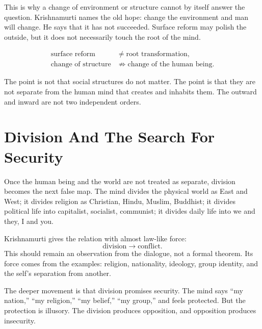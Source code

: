 \documentclass[11pt,oneside]{book}
\begin{document}
This is why a change of environment or structure cannot by itself answer the question. Krishnamurti names the old hope: change the environment and man will change. He says that it has not succeeded. Surface reform may polish the outside, but it does not necessarily touch the root of the mind.

\begin{align}
\text{surface reform}
&\ne
\text{root transformation},\\
\text{change of structure}
&\not\Rightarrow
\text{change of the human being}.
\end{align}

The point is not that social structures do not matter. The point is that they are not separate from the human mind that creates and inhabits them. The outward and inward are not two independent orders.

\section{Division And The Search For Security}

Once the human being and the world are not treated as separate, division becomes the next false map. The mind divides the physical world as East and West; it divides religion as Christian, Hindu, Muslim, Buddhist; it divides political life into capitalist, socialist, communist; it divides daily life into we and they, I and you.

Krishnamurti gives the relation with almost law-like force:
\begin{equation}
\text{division}
\longrightarrow
\text{conflict}.
\end{equation}
This should remain an observation from the dialogue, not a formal theorem. Its force comes from the examples: religion, nationality, ideology, group identity, and the self's separation from another.

The deeper movement is that division promises security. The mind says ``my nation,'' ``my religion,'' ``my belief,'' ``my group,'' and feels protected. But the protection is illusory. The division produces opposition, and opposition produces insecurity.
\end{document}
